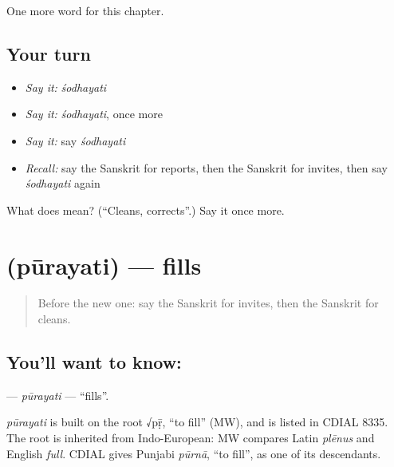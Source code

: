 \begin{grammarlens}[title={What you've built}]
One more word for this chapter.
\end{grammarlens}

\subsection*{Your turn}
\begin{itemize}
\raggedright
  \item \emph{Say it:} \emph{śodhayati}
  \item \emph{Say it:} \emph{śodhayati}, once more
  \item \emph{Say it:} say \emph{śodhayati}
  \item \emph{Recall:} say the Sanskrit for reports, then the Sanskrit for invites, then say \emph{śodhayati} again
\end{itemize}

\begin{tcolorbox}[breakable,colback=teal!4,colframe=teal!35!black,title={Before you move on}]
What does  mean? (\textquotedblleft{}Cleans, corrects\textquotedblright{}.) Say it once more.
\end{tcolorbox}
\section[\texorpdfstring{\sk{पूरयति} (pūrayati)}{पूरयति (pūrayati)}]{ (pūrayati) — fills}

\label{lesson:SA-C176-purayati}



\begin{quote}
Before the new one: say the Sanskrit for invites, then the Sanskrit for cleans.
\end{quote}

\subsection*{You'll want to know: }
\textbf{} — \emph{pūrayati} — \textquotedblleft{}fills\textquotedblright{}.

\begin{cousinweb}
\emph{pūrayati} is built on the root √pṝ, \textquotedblleft{}to fill\textquotedblright{} (MW), and is listed in CDIAL 8335. The root is inherited from Indo-European: MW compares Latin \emph{plēnus} and English \emph{full}. CDIAL gives Punjabi \emph{pūrnā}, \textquotedblleft{}to fill\textquotedblright{}, as one of its descendants.
\end{cousinweb}

